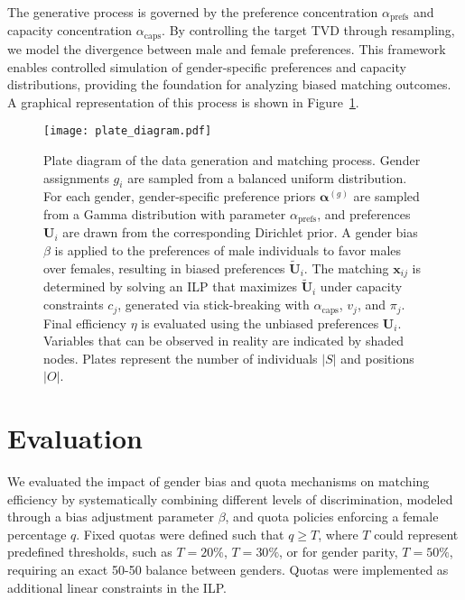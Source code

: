 \documentclass[letterpaper]{article}
\begin{document}
The generative process is governed by the preference concentration \( \alpha_\mathrm{prefs} \) and capacity concentration \( \alpha_\mathrm{caps} \). By controlling the target TVD through resampling, we model the divergence between male and female preferences. This framework enables controlled simulation of gender-specific preferences and capacity distributions, providing the foundation for analyzing biased matching outcomes. A graphical representation of this process is shown in Figure~\ref{fig:plate_diagram}.



\begin{figure}[ht]

  \centering
  \texttt{[image: plate\_diagram.pdf]}
\caption{Plate diagram of the data generation and matching process. Gender assignments \( g_i \) are sampled from a balanced uniform distribution. For each gender, gender-specific preference priors \( \mathbf{\alpha}^{(g)} \) are sampled from a Gamma distribution with parameter \( \alpha_\mathrm{prefs} \), and preferences \( \mathbf{U}_i \) are drawn from the corresponding Dirichlet prior. A gender bias \( \beta \) is applied to the preferences of male individuals to favor males over females, resulting in biased preferences \( \tilde{\mathbf{U}}_i \). The matching \( \mathbf{x}_{ij} \) is determined by solving an ILP that maximizes \( \tilde{\mathbf{U}}_i \) under capacity constraints \( c_j \), generated via stick-breaking with \( \alpha_\mathrm{caps} \), \( v_j \), and \( \pi_j \). Final efficiency \( \eta \) is evaluated using the unbiased preferences \( \mathbf{U}_i \). Variables that can be observed in reality are indicated by shaded nodes. Plates represent the number of individuals \( |S| \) and positions \( |O| \).}

  \label{fig:plate_diagram}
\end{figure}

\section{Evaluation}

We evaluated the impact of gender bias and quota mechanisms on matching efficiency by systematically combining different levels of discrimination, modeled through a bias adjustment parameter \( \beta \), and quota policies enforcing a female percentage \(q\). Fixed quotas were defined such that \( q \geq T \), where \( T \) could represent predefined thresholds, such as \( T = 20\%\), \( T = 30\%\), or for gender parity, \( T = 50\%\), requiring an exact 50-50 balance between genders. Quotas were implemented as additional linear constraints in the ILP. 
\end{document}
